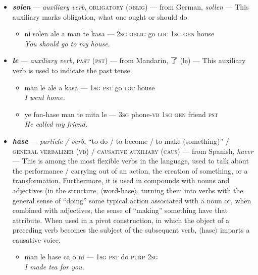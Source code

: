 \documentclass[a4paper, titlepage]{article}
\begin{document}
\begin{itemize}
	\begin{itemize}
		\item metisin ma pei tewa a ni pa ye — medicine \textsc{int pv} give \textsc{loc 2sg instr 3sg} \\\textit{Was the medicine given to you by her?}
	\end{itemize}
	\item \textbf{\textit{solen}} — \textit{auxiliary verb}, \textsc{obligatory (oblig)} — from German, \textit{sollen} — This auxiliary marks obligation, what one ought or should do.
	\begin{itemize}
		\item ni solen ale a man te kasa — \textsc{2sg oblig} go \textsc{loc 1sg gen} house \\\textit{You should go to my house.}
	\end{itemize}
	\item \textbf{\textit{le}} — \textit{auxiliary verb}, \textsc{past (pst)} — from Mandarin, 了 (le) — This auxiliary verb is used to indicate the past tense.
	\begin{itemize}
		\item man le ale a kasa — \textsc{1sg pst} go \textsc{loc} house  \\\textit{I went home.}
		\item ye fon-hase man te mita le — \textsc{3sg} phone-\textsc{vb 1sg gen} friend \textsc{pst} \\\textit{He called my friend.}
	\end{itemize}
	\item \textbf{\textit{hase}} — \textit{particle / verb}, ``to do / to become / to make (something)'' / \textsc{general verbalizer (vb) / causative auxiliary (caus)} — from Spanish, \textit{hacer} — This is among the most flexible verbs in the language, used to talk about the performance / carrying out of an action, the creation of something, or a transformation. Furthermore, it is used in compounds with nouns and adjectives (in the structure, $\langle$word-hase$\rangle$, turning them into verbs with the general sense of ``doing'' some typical action associated with a noun or, when combined with adjectives, the sense of ``making'' something have that attribute. When used in a pivot construction, in which the object of a preceding verb becomes the subject of the subsequent verb, $\langle$hase$\rangle$ imparts a causative voice.
	\begin{itemize}
		\item man le hase ca o ni — \textsc{1sg pst} do \textsc{purp 2sg} \\\textit{I made tea for you.}

\end{itemize}
\end{itemize}
\end{document}
